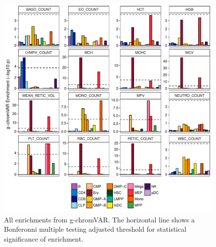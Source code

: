 \documentclass{article}\usepackage[]{graphicx}\usepackage[]{color}
\makeatletter
\def\maxwidth{ %
  \ifdim\Gin@nat@width>\linewidth
    \linewidth
  \else
    \Gin@nat@width
  \fi
}
\newenvironment{knitrout}{}{} %
\makeatother
\begin{document}
\begin{enumerate}[label=(\Alph*)]
\begin{knitrout}
\begin{figure}[H]
{\centering \includegraphics[width=\maxwidth]{figure/allGchromvar-1} 

}

\caption[All enrichments from g-chromVAR]{All enrichments from g-chromVAR. The horizontal line shows a Bonferonni multiple testing adjusted threshold for statistical significance of enrichment.}\label{fig:allGchromvar}
\end{figure}


\end{knitrout}

\begin{knitrout}
\color{fgcolor}\begin{figure}[H]


\end{figure}
\end{knitrout}
\end{enumerate}
\end{document}
